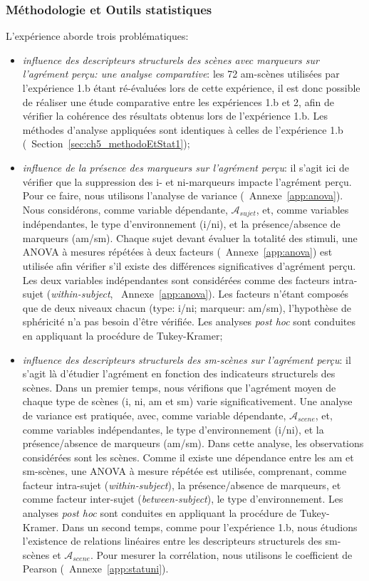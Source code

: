 \subsubsection{Méthodologie et Outils statistiques}
\label{sec:ch5_methodoEtStat2}

L'expérience aborde trois problématiques:

\begin{itemize}
\item \emph{influence des descripteurs structurels des scènes avec marqueurs sur l'agrément perçu: une analyse comparative}: les 72 am-scènes utilisées par l'expérience 1.b étant ré-évaluées lors de cette expérience, il est donc possible de réaliser une étude comparative entre les expériences 1.b et 2, afin de vérifier la cohérence des résultats obtenus lors de l'expérience 1.b. Les méthodes d'analyse appliquées sont identiques à celles de l'expérience 1.b (\cf~Section~\ref{sec:ch5_methodoEtStat1});
\item \emph{influence de la présence des marqueurs sur l'agrément perçu}: il s'agit ici de vérifier que la suppression des i- et ni-marqueurs impacte l'agrément perçu. Pour ce faire, nous utilisons l'analyse de variance (\cf~Annexe~\ref{app:anova}). Nous considérons, comme variable dépendante,  $\mathcal{A}_{sujet}$, et, comme variables indépendantes, le type d'environnement (i/ni), et la présence/absence de marqueurs (am/sm). Chaque sujet devant évaluer la totalité des stimuli, une ANOVA à mesures répétées à deux facteurs (\cf~Annexe~\ref{app:anova}) est utilisée afin vérifier s'il existe des différences significatives d'agrément perçu. Les deux variables indépendantes sont considérées comme des facteurs intra-sujet (\emph{within-subject}, \cf~Annexe~\ref{app:anova}). Les facteurs n'étant composés que de deux niveaux chacun (type: i/ni; marqueur: am/sm), l'hypothèse de sphéricité n'a pas besoin d'être vérifiée. Les analyses \emph{post hoc} sont conduites en appliquant la procédure de Tukey-Kramer;
\item \emph{influence des descripteurs structurels des sm-scènes sur l'agrément perçu}: il s'agit là d'étudier l'agrément en fonction des indicateurs structurels des scènes. Dans un premier temps, nous vérifions que l'agrément moyen de chaque type de scènes (i, ni, am et sm) varie significativement. Une analyse de variance est pratiquée, avec, comme variable dépendante,  $\mathcal{A}_{scene}$, et, comme variables indépendantes, le type d'environnement (i/ni), et la présence/absence de marqueurs (am/sm). Dans cette analyse, les observations considérées sont les scènes. Comme il existe une dépendance entre les am et sm-scènes, une ANOVA à mesure répétée est utilisée, comprenant, comme facteur intra-sujet (\emph{within-subject}), la présence/absence de marqueurs, et comme facteur inter-sujet (\emph{between-subject}), le type d'environnement. Les analyses \emph{post hoc} sont conduites en appliquant la procédure de Tukey-Kramer. Dans un second temps, comme pour l'expérience 1.b, nous étudions l'existence de relations linéaires entre les descripteurs structurels des sm-scènes et $\mathcal{A}_{scene}$. Pour mesurer la corrélation, nous utilisons le coefficient de Pearson (\cf~Annexe~\ref{app:statuni}).
\end{itemize}

